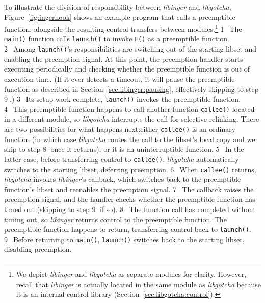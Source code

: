 To illustrate the division of responsibility between \textit{libinger} and
\textit{libgotcha}, Figure~\ref{fig:ingerhook} shows an example program that calls a
preemptible function, alongside the resulting control transfers between
modules.\footnote{We depict \textit{libinger} and \textit{libgotcha} as separate
modules for clarity.  However, recall that \textit{libinger} is actually located in
the same module as \textit{libgotcha} because it is an internal control library
(Section~\ref{sec:libgotcha:control}).} \textcircled{1}~The \texttt{main()} function
calls \texttt{launch()} to invoke \texttt{F()} as a preemptible function.
\textcircled{2}~Among \texttt{launch()}'s responsibilities are switching out of the
starting libset and enabling the preemption signal.  At this point, the preemption
handler starts executing periodically and checking whether the preemptible function
is out of execution time.  (If it ever detects a timeout, it will pause the
preemptible function as described in Section~\ref{sec:libinger:pausing}, effectively
skipping to step \textcircled{9}.)  \textcircled{3}~Its setup work complete,
\texttt{launch()} invokes the preemptible function.  \textcircled{4}~This preemptible
function happens to call another function \texttt{callee()} located in a different
module, so \textit{libgotcha} interrupts the call for selective relinking.  There are
two possibilities for what happens next:\@ either \texttt{callee()} is an ordinary
function (in which case \textit{libgotcha} routes the call to the libset's local copy
and we skip to step \textcircled{8} once it returns), or it is an uninterruptible
function.  \textcircled{5}~In the latter case, before transferring control to
\texttt{callee()}, \textit{libgotcha} automatically switches to the starting libset,
deferring preemption.  \textcircled{6}~When \texttt{callee()} returns,
\textit{libgotcha} invokes \textit{libinger}'s callback, which switches back to the
preemptible function's libset and reenables the preemption signal.
\textcircled{7}~The callback raises the preemption signal, and the handler checks
whether the preemptible function has timed out (skipping to step \textcircled{9} if
so).  \textcircled{8}~The function call has completed without timing out, so
\textit{libinger} returns control to the preemptible function.  The preemptible
function happens to return, transferring control back to \texttt{launch()}.
\textcircled{9}~Before returning to \texttt{main()}, \texttt{launch()} switches back
to the starting libset, disabling preemption.

